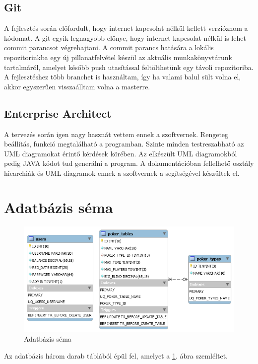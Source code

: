 \subsection{Git}
A fejlesztés során előfordult, hogy internet kapcsolat nélkül kellett verzióznom a kódomat. A git egyik legnagyobb előnye, hogy internet kapcsolat nélkül is lehet commit parancsot végrehajtani. A commit parancs hatására a lokális repozitorinkba egy új pillanatfelvétel készül az aktuális munkakönyvtárunk tartalmáról, amelyet később push utasítással feltölthetünk egy távoli repozitoriba. A fejlesztéshez több branchet is használtam, így ha valami balul sült volna el, akkor egyszerűen visszaálltam volna a masterre.

\subsection{Enterprise Architect}
A tervezés során igen nagy hasznát vettem ennek a szoftvernek. Rengeteg beállítás, funkció megtalálható a programban. Szinte minden testreszabható az UML diagramokat érintő kérdések körében. Az elkészült UML diagramokból pedig JAVA kódot tud generálni a program. A dokumentációban fellelhető osztály hiearchiák és UML diagramok ennek a szoftvernek a segítségével készültek el.

\section{Adatbázis séma}
\begin{figure}[h!]
  \caption{Adatbázis séma}
  \label{fig:db_scheme}
  \centering
    \includegraphics[width=\textwidth]{user-documentation/images/db_scheme2.png}
\end{figure}
Az adatbázis három darab táblából épül fel, amelyet a \ref{fig:db_scheme}. ábra szemléltet.

